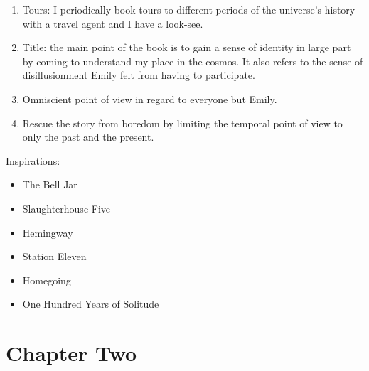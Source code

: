 \documentclass[smalldemyvopaper,11pt,twoside,onecolumn,openright,extrafontsizes]{memoir}
\begin{document}
\begin{enumerate}
    \item Tours: I periodically book tours to different periods of the universe's history with a travel agent and I have a look-see. 
    \item Title: the main point of the book is to gain a sense of identity in large part by coming to understand my place in the cosmos. It also refers to the sense of disillusionment Emily felt from having to participate.
    \item Omniscient point of view in regard to everyone but Emily.
    \item Rescue the story from boredom by limiting the temporal point of view to only the past and the present. 
\end{enumerate}

Inspirations:
\begin{itemize}
    \item The Bell Jar
    \item Slaughterhouse Five
    \item Hemingway
    \item Station Eleven
    \item Homegoing
    \item One Hundred Years of Solitude
\end{itemize}

\chapter{Chapter Two}
\lipsum[21-40]


\end{document}
